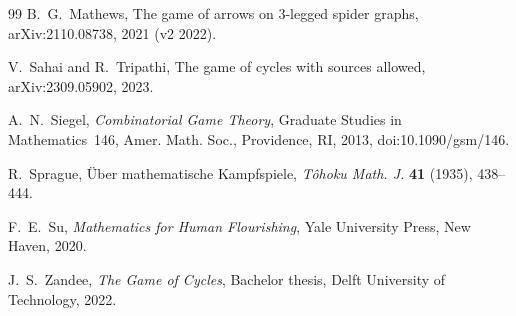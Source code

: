 \documentclass[11pt]{amsart}
\theoremstyle{definition}
\theoremstyle{remark}
\begin{document}
\begin{thebibliography}{99}
B.~G.~Mathews,
\newblock The game of arrows on 3-legged spider graphs,
\newblock arXiv:2110.08738, 2021 (v2 2022).

V.~Sahai and R.~Tripathi,
\newblock The game of cycles with sources allowed,
\newblock arXiv:2309.05902, 2023.

A.~N.~Siegel,
\newblock \emph{Combinatorial Game Theory},
\newblock Graduate Studies in Mathematics~146, Amer. Math. Soc., Providence, RI, 2013, doi:10.1090/gsm/146.

R.~Sprague,
\newblock \"Uber mathematische Kampfspiele,
\newblock \emph{T\^ohoku Math. J.} \textbf{41} (1935), 438--444.

F.~E.~Su,
\newblock \emph{Mathematics for Human Flourishing},
\newblock Yale University Press, New Haven, 2020.

J.~S.~Zandee,
\newblock \emph{The Game of Cycles},
\newblock Bachelor thesis, Delft University of Technology, 2022.

\end{thebibliography}
\end{document}
